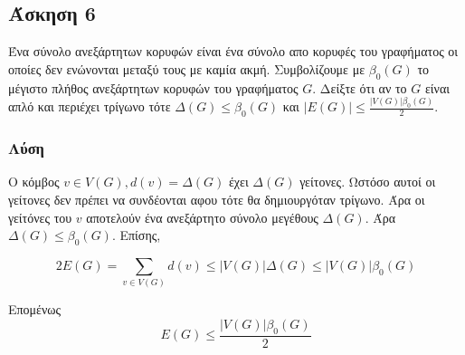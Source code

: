 \newpage\subsection*{Άσκηση 6}

Ένα σύνολο ανεξάρτητων κορυφών είναι ένα σύνολο απο κορυφές του γραφήματος οι οποίες δεν ενώνονται μεταξύ τους με καμία ακμή. 
Συμβολίζουμε με $\beta_0(G)$ το μέγιστο πλήθος ανεξάρτητων κορυφών του γραφήματος $G$. Δείξτε ότι αν το   $G$ είναι απλό και περιέχει 
τρίγωνο τότε $\Delta(G) \le \beta_0(G)$ και $|E(G)| \le \frac{|V(G)|\beta_0(G)}{2}$.

\subsubsection*{Λύση}

Ο κόμβος $v \in V(G), d(v) = \Delta(G)$ έχει $\Delta(G)$ γείτονες. Ωστόσο αυτοί οι γείτονες δεν πρέπει να συνδέονται
αφου τότε θα δημιουργόταν τρίγωνο. Άρα οι γείτόνες του $v$ αποτελούν ένα ανεξάρτητο σύνολο μεγέθους $\Delta(G)$. Άρα
$\Delta(G) \le \beta_0(G)$. Επίσης, 

\begin{equation*}
    2E(G) = \sum_{v \in V(G)} d(v) \le |V(G)|\Delta(G) \le |V(G)|\beta_0(G)
\end{equation*}

Επομένως
\begin{equation*}
    E(G) \le \frac{|V(G)|\beta_0(G)}{2}
\end{equation*}
